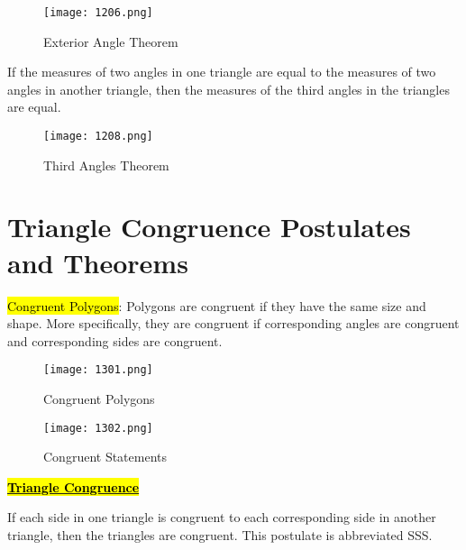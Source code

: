 \begin{figure}[htb!]
  \centering
  \texttt{[image: 1206.png]}
  \caption{Exterior Angle Theorem}
\end{figure}

\newpage

\begin{tcolorbox}[colback=Red!5!white,colframe=Red!75!black,title=Third Angles Theorem (unimportant)]
  If the measures of two angles in one triangle are equal to the measures of two angles in another triangle, then the measures of the third angles in the triangles are equal.
\end{tcolorbox}

\begin{figure}[htb!]
  \centering
  \texttt{[image: 1208.png]}
  \caption{Third Angles Theorem}
\end{figure}

\section{Triangle Congruence Postulates and Theorems}

\hl{Congruent Polygons}: Polygons are congruent if they have the same size and shape. More specifically, they are congruent if corresponding angles are congruent and corresponding sides are congruent.

\begin{figure}[htb!]
  \centering
  \texttt{[image: 1301.png]}
  \caption{Congruent Polygons}
\end{figure}

\begin{figure}[htb!]
  \centering
  \texttt{[image: 1302.png]}
  \caption{Congruent Statements}
\end{figure}

\newpage

\centerline{\underline{\hl{\textbf{\huge Triangle Congruence}}}}

\vspace{.5cm}

\begin{tcolorbox}[colback=Red!5!white,colframe=Red!75!black,title=Side-Side-Side Congruence Postulate]
  If each side in one triangle is congruent to each corresponding side in another triangle, then the triangles are congruent. This postulate is abbreviated SSS.
\end{tcolorbox}

